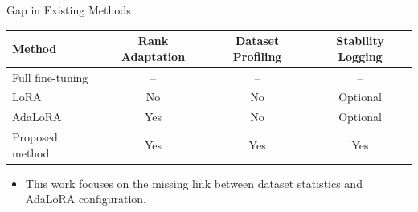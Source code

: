 \begin{frame}{Gap in Existing Methods}
\begin{table}
\centering
\small
\begin{tabular}{lccc}
\toprule
Method & Rank Adaptation & Dataset Profiling & Stability Logging \\
\midrule
Full fine-tuning & -- & -- & -- \\
LoRA & No & No & Optional \\
AdaLoRA & Yes & No & Optional \\
Proposed method & Yes & Yes & Yes \\
\bottomrule
\end{tabular}
\end{table}

\vspace{8pt}
\begin{itemize}
  \item This work focuses on the missing link between dataset statistics and AdaLoRA configuration.
\end{itemize}
\end{frame}
